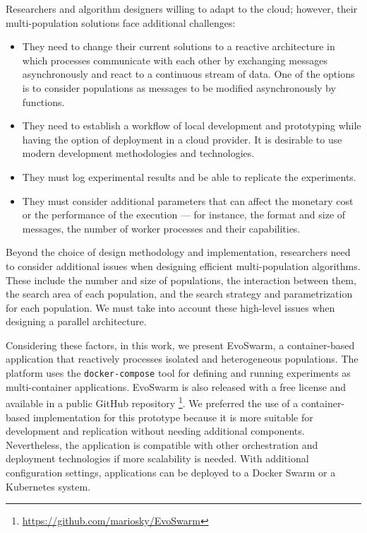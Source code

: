 \documentclass[review]{elsarticle}
\begin{document}
Researchers  and algorithm designers willing to adapt to the cloud; however, their
multi-population solutions face additional challenges:
\begin{itemize}
    \item They need to change their current solutions to a reactive architecture in which processes
    communicate with each other by exchanging messages asynchronously and react
    to a continuous stream of data. One of the options is to consider
    populations as messages to be modified asynchronously by functions. 


    \item They need to establish a workflow of local development and prototyping while having the 
    option of deployment in a cloud provider. It is desirable to use modern development methodologies and technologies. 

    \item They must log experimental results and be able to replicate the experiments. 

    \item They must consider additional parameters that can affect the monetary cost or the performance of the
    execution — for instance, the format and size of messages, the number of
    worker processes and their capabilities.  
\end{itemize}

Beyond the choice of design methodology and implementation, researchers need to
consider additional issues \cite{Ma2019} when designing efficient multi-population algorithms. These include the number and size of populations,
the interaction between them, the search area of each population, and the search
strategy and parametrization for each population. We must take into account
these high-level issues when designing a parallel architecture.

Considering these factors, in this work, we present EvoSwarm, 
a container-based application that reactively processes
isolated and heterogeneous populations. The platform uses the {\tt docker-compose} tool for
defining and running experiments as multi-container applications. EvoSwarm is also released with a free license
and available in a public 
GitHub repository
\footnote{\url{https://github.com/mariosky/EvoSwarm}}.
We preferred the use of a container-based implementation for this prototype because
it is more suitable for development and replication without needing
additional components. Nevertheless, the application is compatible with other
orchestration and deployment technologies if more scalability is needed. 
With additional configuration settings, applications can be deployed 
to a Docker Swarm or a Kubernetes system.
\end{document}
